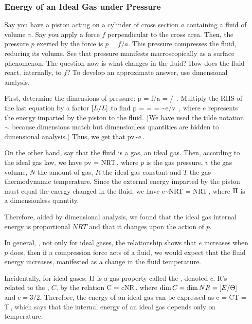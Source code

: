 \subsubsection{Energy of an Ideal Gas under Pressure}
Say you have a piston acting on a cylinder of cross section $a$ containing a fluid of volume $v$. Say you apply a force $f$ perpendicular to the cross area. Then, the pressure $p$ exerted by the force is $p = f/a$. This pressure compresses the fluid, reducing its volume. See that pressure manifests macroscopically as a surface phenomenon. The question now is what changes in the fluid? How does the fluid react, internally, to $f$? To develop an approximate answer, use dimensional analysis. 

First, determine the dimensions of pressure:
\beq
\dim p = \dim f/a = / \,.
\eeq
Multiply the RHS of the last equation by a factor $\left[{L/L}\right]$ to find
\beq
\dim p =  =  = \sim e/v \,,
\eeq
where $e$ represents the energy imparted by the piston to the fluid. (We have used the tilde notation $\sim$ because dimensions match but dimensionless quantities are hidden to dimensional analysis.) Thus, we get that
\beq
pv\sim e\,.
\eeq

On the other hand, say that the fluid is a gas, an ideal gas. Then, according to the ideal gas law, we have
\beq
pv = NRT\,,
\eeq
where $p$ is the gas pressure, $v$ the gas volume, $N$ the amount of gas, $R$ the ideal gas constant and $T$ the gas thermodynamic temperature. Since the external energy imparted by the piston must equal the energy changed in the fluid, we have
\beq
e\sim NRT = \kdim NRT\,,
\eeq
where $\Pi$ is a dimensionless quantity.

Therefore, aided by dimensional analysis, we found that the ideal gas internal energy is proportional $NRT$ and that it changes upon the action of $p$. 

In general, \ie, not only for ideal gases, the relationship shows that $e$ increases when $p$ does, then if a compression force acts of a fluid, we would expect that the fluid energy increases, manifested as a change in the fluid temperature.

Incidentally, for ideal gases, $\Pi$ is a gas property called the , denoted $c$. It's related to the , $C$, by the relation
\beq
C = cNR\,,
\eeq
where $\dim C = \dim NR = \left[{E/\Theta}\right]$ and $c = 3/2$. Therefore, the energy of an ideal gas can be expressed as
\beq
e = CT = T\,,
\eeq
which says that the internal energy of an ideal gas depends only on temperature.


